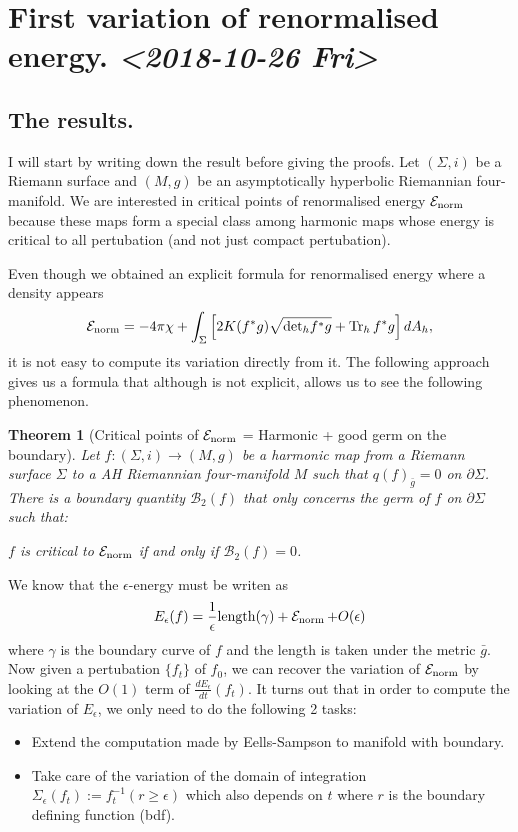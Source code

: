 \documentclass[11pt]{article}
\author{Tien}
\date{\today}
\title{}
\newtheorem{theorem}{Theorem}
\newcommand{\tr}{\mathop{\rm Tr}\nolimits}
\newcommand{\Enorm}{\mathop{\mathcal{E}_{\rm norm}}\nolimits}
\begin{document}
\tableofcontents


\section{First variation of renormalised energy. \textit{<2018-10-26 Fri>}}
\label{sec:org3eec4ba}
\subsection{The results.}
\label{sec:orgfcf699d}

I will start by writing down the result before giving the proofs. Let \((\Sigma,i)\)
be a Riemann surface and \((M,g)\) be an asymptotically hyperbolic Riemannian
four-manifold. We are interested in critical points of renormalised energy \(\Enorm\)
because these maps form a special class among harmonic maps whose energy is critical to all
pertubation (and not just compact pertubation).

Even though we obtained an explicit formula for renormalised energy where a density appears
\[
  \Enorm = -4\pi\chi + \int_\Sigma \left[ 2K(f^*g)\sqrt{{\rm det}_h f^*g} + \tr_h f^*g \right] dA_h,
  \]
it is not easy to compute its variation directly from it. The following
approach gives us a formula that although is not explicit, allows us to see the
following phenomenon.
\begin{theorem}[Critical points of \(\Enorm\) = Harmonic + good germ on the boundary]
\label{thm:crit-Enorm-bndry-germ}
Let \(f: (\Sigma,i) \longrightarrow (M,g)\) be a harmonic map from a Riemann surface \(\Sigma\) to
a AH Riemannian four-manifold \(M\) such that \(q(f)_{\bar g} = 0\) on \(\partial\Sigma\). There is a boundary quantity \(\mathcal{B}_2(f)\) that only concerns the germ of \(f\) on \(\partial\Sigma\) such that:
\begin{center}
\(f\) is critical to \(\Enorm\) if and only if \(\mathcal{B}_2(f) = 0\).
\end{center}
\end{theorem}

We know that the \(\epsilon\)-energy must be writen as
\[
   E_\epsilon (f) = \frac{1}{\epsilon} {\rm length}(\gamma) + \Enorm + O(\epsilon)
  \]
where \(\gamma\) is the boundary curve of \(f\) and the length is taken under the
metric \(\bar g\). Now given a pertubation \(\{f_t\}\) of \(f_0\), we can recover
the variation of \(\Enorm\) by looking at the \(O(1)\) term of \(\frac{dE_\epsilon}{dt}(f_t)\). It turns out that in order to compute the variation of
\(E_\epsilon\), we only need to do the following 2 tasks:
\begin{itemize}
\item Extend the computation made by Eells-Sampson \cite{eells_harmonic_1964} to manifold with boundary.
\item Take care of the variation of the domain of integration \(\Sigma_\epsilon(f_t):=
    f_t^{-1}(r\geq\epsilon)\) which also depends on \(t\) where \(r\) is the boundary
defining function (bdf).
\end{itemize}
\end{document}
